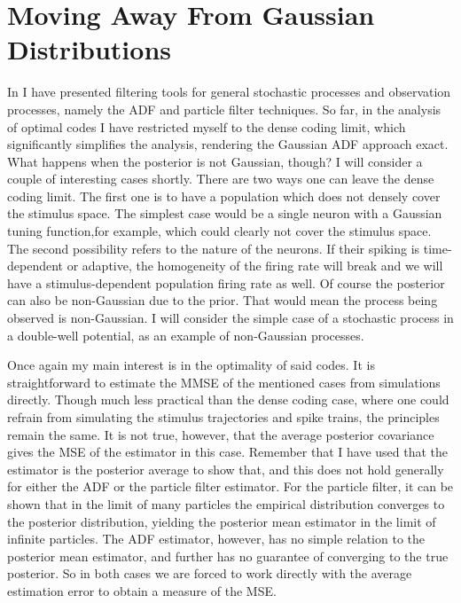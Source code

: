\section{Moving Away From Gaussian Distributions}

In  I have presented filtering tools for general stochastic processes and observation processes, namely the ADF and particle filter techniques.
So far, in the analysis of optimal codes I have restricted myself to the dense coding limit, which significantly simplifies the analysis, rendering the Gaussian ADF approach
exact. What happens when the posterior is not Gaussian, though? I will consider a couple of interesting cases shortly. There are two ways one can leave the dense
coding limit. The first one is to have a population which does not densely cover the stimulus space. The simplest case would be a single neuron with a Gaussian tuning function,\footnotemark for example,
which could clearly not cover the stimulus space. The second possibility refers to the nature of the neurons. If their spiking is time-dependent or adaptive, the homogeneity of the firing
rate will break and we will have a stimulus-dependent population firing rate as well. Of course the posterior can also be non-Gaussian due to the prior. That would mean the
process being observed is non-Gaussian. I will consider the simple case of a stochastic process in a double-well potential, as an example of non-Gaussian processes.
\par

Once again my main interest is in the optimality of said codes. It is straightforward to estimate the MMSE of the mentioned cases from simulations directly. 
Though much less practical than the dense coding case, where one could refrain from simulating the stimulus trajectories and spike trains, the principles remain the
same. It is not true, however, that the average posterior covariance gives the MSE of the estimator in this case. Remember that I have used that the estimator is the
posterior average to show that, and this does not hold generally for either the ADF or the particle filter estimator. For the particle filter, it can be shown that
in the limit of many particles the empirical distribution converges to the posterior distribution, yielding the posterior mean estimator in the limit of infinite particles. 
The ADF estimator, however, has no simple relation to the posterior mean estimator, and further has no guarantee of converging to the true posterior. So in both cases we are forced 
to work directly with the average estimation error to obtain a measure of the MSE.\par

